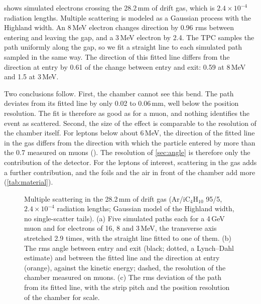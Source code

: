  shows simulated electrons crossing the 28.2\,mm of drift gas, which is $2.4\times10^{-4}$
radiation lengths. Multiple scattering is modeled as a Gaussian process with the Highland width. An 8\,MeV electron
changes direction by 0.96\textdegree{} rms between entering and leaving the gap, and a 3\,MeV electron by
2.4\textdegree. The TPC samples the path uniformly along the gap, so we fit a straight line to each simulated path
sampled in the same way. The direction of this fitted line differs from the direction at entry by 0.61 of the change
between entry and exit: 0.59\textdegree{} at 8\,MeV and 1.5\textdegree{} at 3\,MeV.

Two conclusions follow. First, the chamber cannot see this bend. The path deviates from its fitted line by only 0.02
to 0.06\,mm, well below the position resolution. The fit is therefore as good as for a muon, and nothing identifies
the event as scattered. Second, the size of the effect is comparable to the resolution of the chamber itself. For
leptons below about 6\,MeV, the direction of the fitted line in the gas differs from the direction with which the
particle entered by more than the 0.7\textdegree{} measured on muons (). The resolution of
\cref{sec:angle} is therefore only the contribution of the detector. For the leptons of interest, scattering in the
gas adds a further contribution, and the foils and the air in front of the chamber add more (\cref{tab:material}).

\begin{figure}[tbp]
  \centering
  \caption{Multiple scattering in the 28.2\,mm of drift gas (Ar/iC$_4$H$_{10}$ 95/5, $2.4\times10^{-4}$ radiation
  lengths; Gaussian model of the Highland width, no single-scatter tails). (a) Five simulated paths each for a 4\,GeV
  muon and for electrons of 16, 8 and 3\,MeV, the transverse axis stretched 2.9 times, with the straight line fitted to
  one of them. (b) The rms angle between entry and exit (black; dotted, a Lynch--Dahl estimate) and between the fitted
  line and the direction at entry (orange), against the kinetic energy; dashed, the resolution of the chamber measured
  on muons. (c) The rms deviation of the path from its fitted line, with the strip pitch and the position resolution
  of the chamber for scale.}
  \label{fig:gasscatter}
\end{figure}

